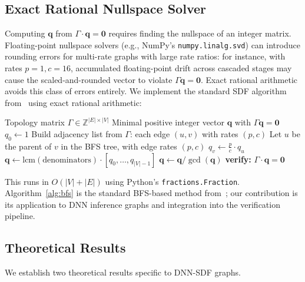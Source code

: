 \documentclass[journal]{IEEEtran}
\begin{document}
\subsection{Exact Rational Nullspace Solver}
\label{sec:solver}

Computing $\mathbf{q}$ from $\Gamma \cdot \mathbf{q} = \mathbf{0}$ requires finding the nullspace of an integer matrix.
Floating-point nullspace solvers (e.g., NumPy's \texttt{numpy.linalg.svd}) can introduce rounding errors for multi-rate graphs with large rate ratios: for instance, with rates $p=1, c=16$, accumulated floating-point drift across cascaded stages may cause the scaled-and-rounded vector to violate $\Gamma \mathbf{q} = \mathbf{0}$. Exact rational arithmetic avoids this class of errors entirely.
We implement the standard SDF algorithm from~\cite{lee1987sdf} using exact rational arithmetic:

\begin{algorithm}[htbp]
\caption{BFS-based Exact Repetition Vector}
\label{alg:bfs}
\begin{algorithmic}[1]
\REQUIRE Topology matrix $\Gamma \in \mathbb{Z}^{|E| \times |V|}$
\ENSURE Minimal positive integer vector $\mathbf{q}$ with $\Gamma \mathbf{q} = \mathbf{0}$
\STATE $q_0 \leftarrow 1$ 
\STATE Build adjacency list from $\Gamma$: each edge $(u, v)$ with rates $(p, c)$
    \STATE Let $u$ be the parent of $v$ in the BFS tree, with edge rates $(p, c)$
    \STATE $q_v \leftarrow \frac{p}{c} \cdot q_u$ 
\ENDFOR
\STATE $\mathbf{q} \leftarrow \mathrm{lcm}(\text{denominators}) \cdot [q_0, \ldots, q_{|V|-1}]$
\STATE $\mathbf{q} \leftarrow \mathbf{q} / \gcd(\mathbf{q})$
\STATE \textbf{verify:} $\Gamma \cdot \mathbf{q} = \mathbf{0}$
\end{algorithmic}
\end{algorithm}

This runs in $O(|V| + |E|)$ using Python's \texttt{fractions.Fraction}.
Algorithm~\ref{alg:bfs} is the standard BFS-based method from~\cite{lee1987sdf}; our contribution is its application to DNN inference graphs and integration into the verification pipeline.

\subsection{Theoretical Results}
\label{sec:theory}

We establish two theoretical results specific to DNN-SDF graphs.
\end{document}
